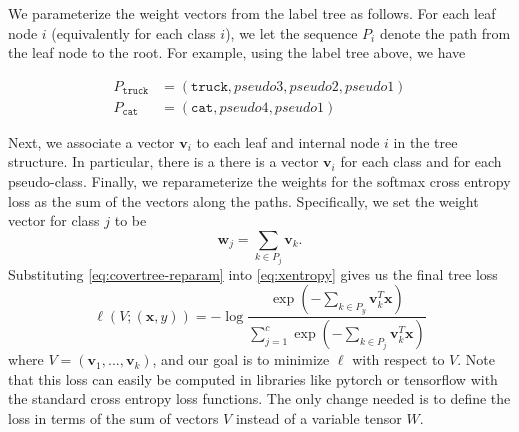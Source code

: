 \documentclass[twoside]{article}
\theoremstyle{definition}
\newcommand{\trans}[1]{{#1}^{T}}
\newcommand{\vv}{\mathbf v}
\newcommand{\w}{\mathbf w}
\newcommand{\x}{\mathbf x}
\begin{document}
\begin{center}
\end{center}

We parameterize the weight vectors from the label tree as follows.
For each leaf node $i$ (equivalently for each class $i$),
we let the sequence $P_i$ denote the path from the leaf node to the root.
For example, using the label tree above,
we have

\begin{equation}
\begin{split}
    P_{\texttt{truck}} &= (\texttt{truck}, \textit{pseudo3}, \textit{pseudo2}, \textit{pseudo1} ) \\
    P_{\texttt{cat}} &= (\texttt{cat}, \textit{pseudo4}, \textit{pseudo1} )
\end{split}
\end{equation}


Next, we associate a vector $\vv_i$ to each leaf and internal node $i$ in the tree structure.
In particular, there is a there is a vector $\vv_i$ for each class and for each pseudo-class.
Finally, we reparameterize the weights for the softmax cross entropy loss as the sum of the vectors along the paths.
Specifically, we set the weight vector for class $j$ to be 
\begin{equation}
    \label{eq:covertree-reparam}
    \w_j = \sum_{k\in P_j} \vv_k
    .
\end{equation}
Substituting \eqref{eq:covertree-reparam} into \eqref{eq:xentropy} gives us the final tree loss
\begin{equation}
    \ell(V;(\x,y)) = - \log \frac {\exp(-\sum_{k\in P_y}\trans\vv_k \x)}{\sum_{j=1}^c \exp(- \sum_{k\in P_j}\trans\vv_k \x)}
\end{equation}
where $V=(\vv_1,...,\vv_k)$,
and our goal is to minimize $\ell$ with respect to $V$.
Note that this loss can easily be computed in libraries like pytorch or tensorflow with the standard cross entropy loss functions.
The only change needed is to define the loss in terms of the sum of vectors $V$ instead of a variable tensor $W$.
\end{document}
